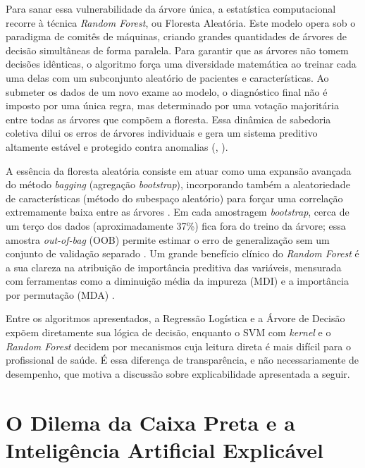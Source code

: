 \documentclass[
    12pt
    ,oneside
    ,a4paper
    ,chapter=TITLE
    ,section=TITLE
    ,sumario=abnt-6027-2012
    ,english,brazil]{abntex2} %
\begin{document}
Para sanar essa vulnerabilidade da árvore única, a estatística computacional recorre à técnica \textit{Random Forest}, ou Floresta Aleatória. Este modelo opera sob o paradigma de comitês de máquinas, criando grandes quantidades de árvores de decisão simultâneas de forma paralela. Para garantir que as árvores não tomem decisões idênticas, o algoritmo força uma diversidade matemática ao treinar cada uma delas com um subconjunto aleatório de pacientes e características. Ao submeter os dados de um novo exame ao modelo, o diagnóstico final não é imposto por uma única regra, mas determinado por uma votação majoritária entre todas as árvores que compõem a floresta. Essa dinâmica de sabedoria coletiva dilui os erros de árvores individuais e gera um sistema preditivo altamente estável e protegido contra anomalias (, \citeyear{Faceli2011}).

A essência da floresta aleatória consiste em atuar como uma expansão avançada do método \textit{bagging} (agregação \textit{bootstrap}), incorporando também a aleatoriedade de características (método do subespaço aleatório) para forçar uma correlação extremamente baixa entre as árvores \cite{ibm_random_forest_2026}. Em cada amostragem \textit{bootstrap}, cerca de um terço dos dados (aproximadamente 37\%) fica fora do treino da árvore; essa amostra \textit{out-of-bag} (OOB) permite estimar o erro de generalização sem um conjunto de validação separado \cite{ibm_random_forest_2026}. Um grande benefício clínico do \textit{Random Forest} é a sua clareza na atribuição de importância preditiva das variáveis, mensurada com ferramentas como a diminuição média da impureza (MDI) e a importância por permutação (MDA) \cite{ibm_random_forest_2026}.

Entre os algoritmos apresentados, a Regressão Logística e a Árvore de Decisão expõem diretamente sua lógica de decisão, enquanto o SVM com \textit{kernel} e o \textit{Random Forest} decidem por mecanismos cuja leitura direta é mais difícil para o profissional de saúde. É essa diferença de transparência, e não necessariamente de desempenho, que motiva a discussão sobre explicabilidade apresentada a seguir.

\section{O Dilema da Caixa Preta e a Inteligência Artificial Explicável}
\end{document}
